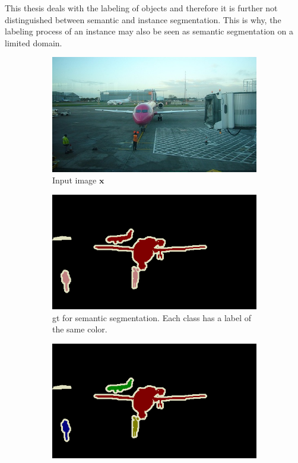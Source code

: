 This thesis deals with the labeling of objects and therefore it is further not distinguished between semantic and instance segmentation.
This is why, the labeling process of an instance may also be seen as semantic segmentation on a limited domain.
\begin{figure} [h]
	\centering
	\begin{subfigure}[t]{0.3\textwidth}
		\centering
		\includegraphics[width=\textwidth]{figures/chap22_image.jpg}
		\caption{
			Input image $\textbf{x}$
		}\label{fig:ch2:sec2:image}
	\end{subfigure}
	\hfill
	\begin{subfigure}[t]{0.3\textwidth}
		\centering
		\includegraphics[width=\textwidth]{figures/chap22_semantic_seg.png}
		\caption{
			\gls{gt} for semantic segmentation.
			Each class has a label of the same color.
		} \label{fig:ch2:sec2:semantic_seg}
	\end{subfigure}
	\hfill
	\begin{subfigure}[t]{0.3\textwidth}
		\centering
		\includegraphics[width=\textwidth]{figures/chap22_instance_seg.png}

\end{subfigure}
\end{figure}

